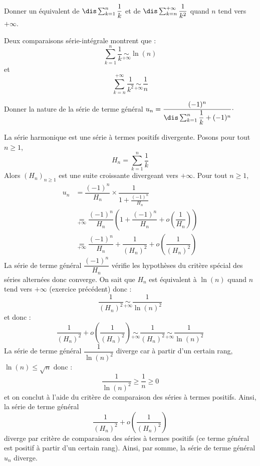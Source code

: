 \documentclass[a4paper,10pt]{report}
\begin{document}
\begin{Exa} Donner un équivalent de $\dis \sum_{k=1}^n \dfrac{1}{k}$ et de $\dis \sum_{k=n}^{+ \infty} \dfrac{1}{k^2}$ quand $n$ tend vers $+ \infty$.
\end{Exa} 

\corr Deux comparaisons série-intégrale montrent que :
$$ \sum_{k=1}^n \dfrac{1}{k} \underset{+ \infty}{\sim} \ln(n) $$
et 
$$ \sum_{k=n}^{+ \infty} \dfrac{1}{k^2} \underset{+ \infty}{\sim} \dfrac{1}{n} $$

\begin{Exa} Donner la nature de la série de terme général $u_n = \dfrac{(-1)^n}{\dis \sum_{k=1}^n \dfrac{1}{k} + (-1)^n} \cdot$
\end{Exa}

\corr La série harmonique est une série à termes positifs divergente. Posons pour  tout $n \geq 1$,
$$ H_n = \sum_{k=1}^n \dfrac{1}{k}$$
Alors $(H_n)_{n \geq 1}$ est une suite croissante divergeant vers $+ \infty$. Pour tout $n \geq 1$,
\begin{align*}
u_n & = \dfrac{(-1)^n}{H_n} \times \dfrac{1}{1+ \frac{(-1)^n}{H_n}} \\
& \underset{+\infty}{=}  \dfrac{(-1)^n}{H_n} \left( 1 + \dfrac{(-1)^n}{H_n} + o \left( \dfrac{1}{H_n} \right) \right) \\
& \underset{+\infty}{=}  \dfrac{(-1)^n}{H_n}  +\dfrac{1}{(H_n)^2} + o \left( \dfrac{1}{(H_n)^2} \right) 
\end{align*}
La série de terme général $\dfrac{(-1)^n}{H_n}$ vérifie les hypothèses du critère spécial des séries alternées donc converge. On sait que $H_n$ est équivalent à $\ln(n)$ quand $n$ tend vers $+ \infty$ (exercice précédent) donc :
$$ \dfrac{1}{(H_n)^2} \underset{+ \infty}{\sim} \dfrac{1}{\ln(n)^2}$$
et donc :
$$ \dfrac{1}{(H_n)^2} + o \left( \dfrac{1}{(H_n)^2} \right)  \underset{+ \infty}{\sim}  \dfrac{1}{(H_n)^2} \underset{+ \infty}{\sim} \dfrac{1}{\ln(n)^2}$$
La série de terme général $\dfrac{1}{\ln(n)^2}$ diverge car à partir d'un certain rang, $\ln(n) \leq \sqrt{n}$ donc :
$$ \dfrac{1}{\ln(n)^2} \geq \dfrac{1}{n} \geq 0$$
et on conclut à l'aide du critère de comparaison des séries à termes positifs. Ainsi, la série de terme général 
$$\dfrac{1}{(H_n)^2} + o \left( \dfrac{1}{(H_n)^2} \right)$$
diverge par critère de comparaison des séries à termes positifs (ce terme général est positif à partir d'un certain rang). Ainsi, par somme, la série de terme général $u_n$ diverge.
%
%
\end{document}
